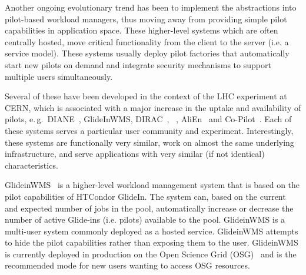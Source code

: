 \documentclass{sig-alternate}
\begin{document}
Another ongoing evolutionary trend has been to implement the \pilot abstractions
into pilot-based workload managers, thus moving away from providing simple pilot
capabilities in application space. These higher-level systems which are often
centrally hosted, move critical functionality from the client to the server
(i.e. a service model). These systems usually deploy pilot factories that
automatically start new pilots on demand and integrate security mechanisms to
support multiple users simultaneously.

Several of these have been developed in the context of the LHC experiment at
CERN, which is associated with a major increase in the uptake and availability
of pilots, e.\,g.\ DIANE~\cite{moscicki2003diane}, GlideInWMS,
DIRAC~\cite{casajus2010dirac}, \panda~\cite{zhao2011panda},
AliEn~\cite{saiz2003alien} and Co-Pilot~\cite{buncicco2011co}. Each of these
\pilotjob systems serves a particular user community and experiment.
Interestingly, these systems are functionally very similar, work on almost the
same underlying infrastructure, and serve applications with very similar (if not
identical) characteristics.


  

GlideinWMS~\cite{sfiligoi2008glideinwms} is a higher-level workload management
system that is based on the pilot capabilities of HTCondor GlideIn. The system
can, based on the current and expected number of jobs in the pool, automatically
increase or decrease the number of active Glide-ins (i.e. pilots) available to
the pool. GlideinWMS is a multi-user \pilotjob system commonly deployed as a
hosted service. GlideinWMS attempts to hide the pilot capabilities rather than
exposing them to the user. GlideinWMS is currently deployed in production on the
Open Science Grid (OSG)~\cite{osg_url} and is the recommended mode for new users
wanting to access OSG resources.
\end{document}
